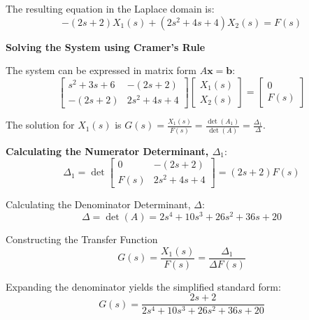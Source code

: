 ﻿\documentclass[11pt]{article}
\begin{document}
The resulting equation in the Laplace domain is:
\begin{equation}
-(2s + 2)X_1(s) + (2s^2 + 4s + 4)X_2(s) = F(s) \tag{2}
\end{equation}

\newpage
\noindent\textbf{Solving the System using Cramer's Rule}
\vspace{12pt}

The system can be expressed in matrix form $A\mathbf{x} = \mathbf{b}$:
$$
\begin{bmatrix}
s^2 + 3s + 6 & -(2s + 2) \\
-(2s + 2) & 2s^2 + 4s + 4
\end{bmatrix}
\begin{bmatrix}
X_1(s) \\
X_2(s)
\end{bmatrix}
=
\begin{bmatrix}
0 \\
F(s)
\end{bmatrix}
$$

The solution for $X_1(s)$ is $G(s) = \frac{X_1(s)}{F(s)} = \frac{\det(A_1)}{\det(A)} = \frac{\Delta_1}{\Delta}$.

\vspace{12pt}
\noindent\textbf{Calculating the Numerator Determinant, $\Delta_1$}:
$$ \Delta_1 = \det
\begin{bmatrix}
0 & -(2s + 2) \\
F(s) & 2s^2 + 4s + 4
\end{bmatrix}
= (2s + 2)F(s) $$

{Calculating the Denominator Determinant, $\Delta$}:
$$\Delta = \det(A) = 2s^4 + 10s^3 + 26s^2 + 36s + 20$$

{Constructing the Transfer Function}
$$G(s) = \frac{X_1(s)}{F(s)} = \frac{\Delta_1}{\Delta F(s)}$$

Expanding the denominator yields the simplified standard form:
\[
\boxed{
G(s) = \frac{2s + 2}{2s^4 + 10s^3 + 26s^2 + 36s + 20}
}
\]

\end{document}
